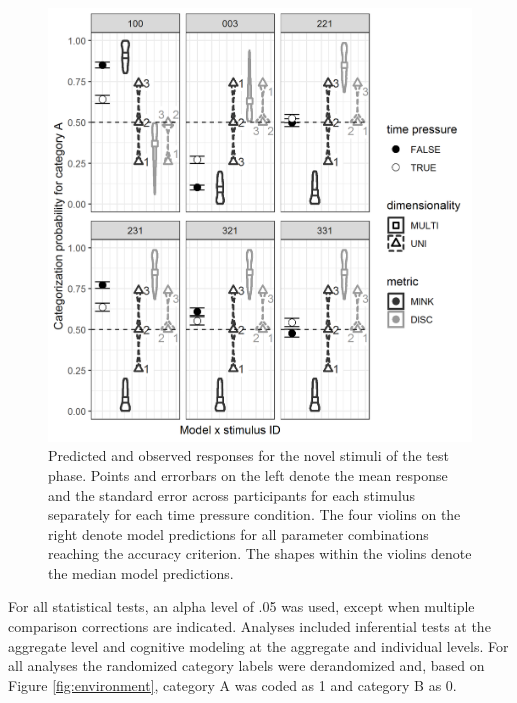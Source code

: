 \documentclass[a4paper,man,natbib]{apa6}
\begin{document}
\begin{figure}
\centering
\includegraphics[width = \textwidth]{fig_pred_obs_agg.png}
\caption{Predicted and observed responses for the novel stimuli of the test phase. Points and errorbars on the left denote the mean response and the standard error across participants for each stimulus separately for each time pressure condition. The four violins on the right denote model predictions for all parameter combinations reaching the accuracy criterion. The shapes within the violins denote the median model predictions.}
\label{fig:pred_obs_agg}
\end{figure}

For all statistical tests, an alpha level of .05 was used, except when multiple comparison corrections are indicated. Analyses included inferential tests at the aggregate level and cognitive modeling at the aggregate and individual levels. For all analyses the randomized category labels were derandomized and, based on Figure \ref{fig:environment}, category A was coded as 1 and category B as 0.
\end{document}
